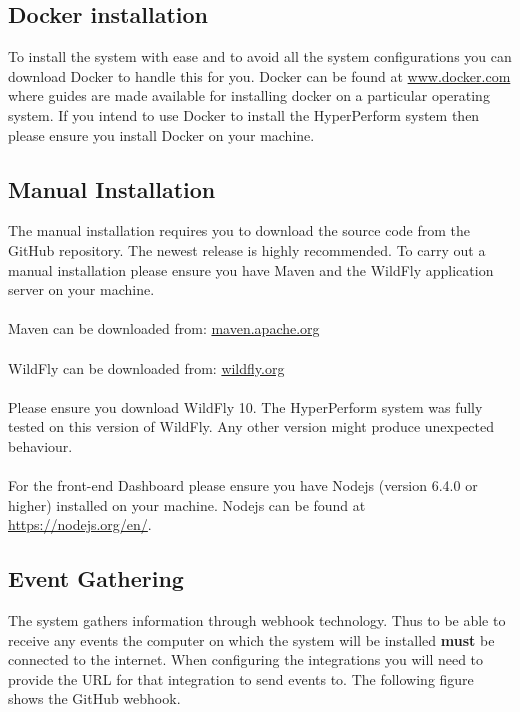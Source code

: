 \documentclass[11pt,a4paper]{article}
\begin{document}
\subsection{Docker installation}
To install the system with ease and to avoid all the system configurations you can download Docker to handle this for you. Docker can be found at \url{www.docker.com} where guides are made available for installing docker on a particular operating system. If you intend to use Docker to install the HyperPerform system then please ensure you install Docker on your machine.

\subsection{Manual Installation}
The manual installation requires you to download the source code from the GitHub repository. The newest release is highly recommended. To carry out a manual installation please ensure you have Maven and the WildFly application server on your machine. \\ \\
Maven can be downloaded from: \url{maven.apache.org} \\ \\
WildFly can be downloaded from: \url{wildfly.org} \\ \\
Please ensure you download WildFly 10. The HyperPerform system was fully tested on this version of WildFly. Any other version might produce unexpected behaviour. \\ \\
For the front-end Dashboard please ensure you have Nodejs (version 6.4.0 or higher) installed on your machine. Nodejs can be found at \url{https://nodejs.org/en/}.

\subsection{Event Gathering}
The system gathers information through webhook technology. Thus to be able to receive any events the computer on which the system will be installed \textbf{must} be connected to the internet. When configuring the integrations you will need to provide the URL for that integration to send events to. The following figure shows the GitHub webhook.
\end{document}
